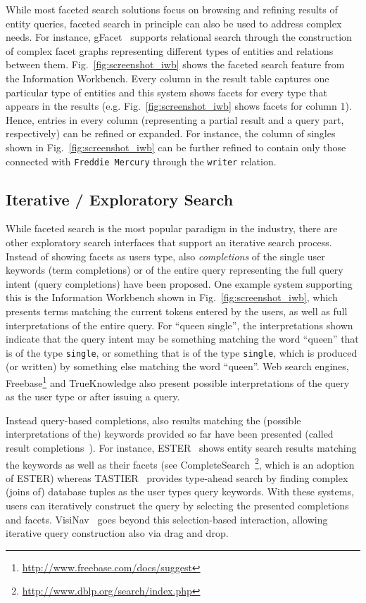 While most faceted search solutions focus on browsing and refining results of entity queries, faceted search in principle can also be used to address complex needs. For instance, gFacet~\cite{DBLP:conf/esws/HeimEZ10} supports relational search through the construction of complex facet graphs representing different types of entities and relations between them. Fig.~\ref{fig:screenshot_iwb} shows the faceted search feature from the Information Workbench. Every column in the result table captures one particular type of entities and this system shows facets for every type that appears in the results (e.g. Fig.~\ref{fig:screenshot_iwb} shows facets for column 1). Hence, entries in every column (representing a partial result and a query part, respectively) can be refined or expanded. For instance, the column of singles shown in Fig.~\ref{fig:screenshot_iwb} can be further refined to contain only those connected with \verb+Freddie Mercury+ through the \verb+writer+ relation. 

\subsection{Iterative / Exploratory Search} 
While faceted search is the most popular paradigm in the industry, there are other exploratory search interfaces that support an iterative search process. Instead of showing facets as users type, also \emph{completions} of the single user keywords (term completions) or of the entire query representing the full query intent (query completions) have been proposed. One example system supporting this is the Information Workbench shown in Fig.~\ref{fig:screenshot_iwb}, which presents terms matching the current tokens entered by the users, as well as full interpretations of the entire query. For ``queen single'', the interpretations shown indicate that the query intent may be something matching the word ``queen'' that is of the type \verb+single+, or something that is of the type \verb+single+, which is produced (or written) by something else matching the word ``queen''. Web search engines, Freebase\footnote{\url{http://www.freebase.com/docs/suggest}} and TrueKnowledge also present possible interpretations of the query as the user type or after issuing a query. 

Instead query-based completions, also results matching the (possible interpretations of the) keywords provided so far have been presented (called result completions~\cite{DBLP:conf/esws/TranMH10}). For instance, ESTER~\cite{DBLP:conf/sigir/BastCSW07} shows entity search results matching the keywords as well as their facets (see CompleteSearch~\footnote{\url{http://www.dblp.org/search/index.php}}, which is an adoption of ESTER) whereas TASTIER~\cite{DBLP:conf/sigmod/LiJLF09} provides type-ahead search by finding complex (joins of) database tuples as the user types query keywords. With these systems, users can iteratively construct the query by selecting the presented completions and facets. VisiNav~\cite{DBLP:journals/ws/Harth10} goes beyond this selection-based interaction, allowing iterative query construction also via drag and drop. 	
	
